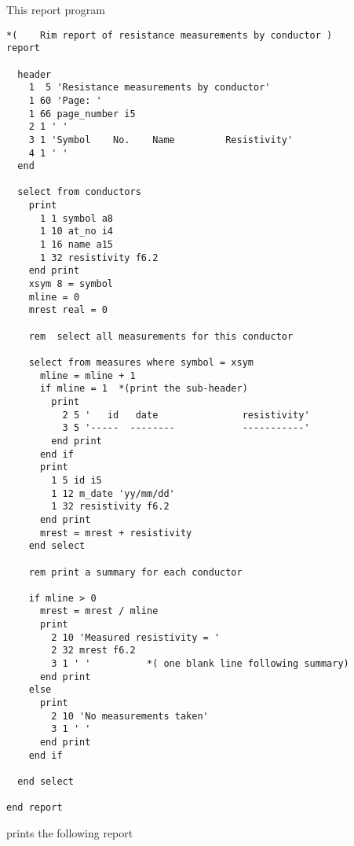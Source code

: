 \documentclass[11pt,a4paper]{report}
\begin{document}
\demobreak
This report program
\begin{verbatim}
*(    Rim report of resistance measurements by conductor )
report
 
  header
    1  5 'Resistance measurements by conductor'
    1 60 'Page: '
    1 66 page_number i5
    2 1 ' '
    3 1 'Symbol    No.    Name         Resistivity'
    4 1 ' '
  end
 
  select from conductors
    print
      1 1 symbol a8
      1 10 at_no i4
      1 16 name a15
      1 32 resistivity f6.2
    end print
    xsym 8 = symbol
    mline = 0
    mrest real = 0
 
    rem  select all measurements for this conductor
 
    select from measures where symbol = xsym
      mline = mline + 1
      if mline = 1  *(print the sub-header)
        print
          2 5 '   id   date               resistivity'
          3 5 '-----  --------            -----------'
        end print
      end if
      print
        1 5 id i5
        1 12 m_date 'yy/mm/dd'
        1 32 resistivity f6.2
      end print
      mrest = mrest + resistivity
    end select
 
    rem print a summary for each conductor
 
    if mline > 0
      mrest = mrest / mline
      print
        2 10 'Measured resistivity = '
        2 32 mrest f6.2
        3 1 ' '          *( one blank line following summary)
      end print
    else
      print
        2 10 'No measurements taken'
        3 1 ' '
      end print
    end if
 
  end select
 
end report
\end{verbatim}
 
prints the following report
\end{document}
